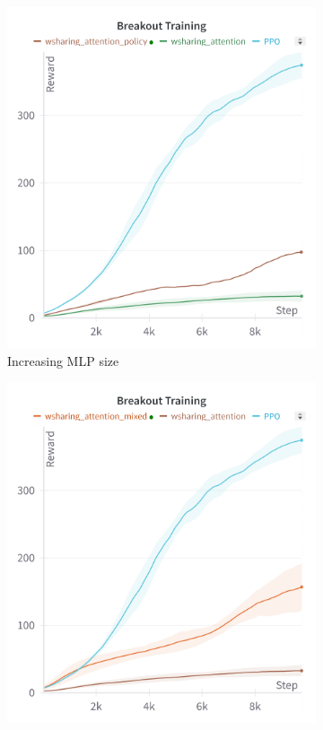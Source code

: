 \begin{figure}[ht]
    \centering
    \begin{subfigure}[b]{0.32\textwidth}
        \centering
        \includegraphics[width=\textwidth]{images/breakout_policy.png}
        \caption{Increasing MLP size}
        \label{fig:breakout_policy}
    \end{subfigure}
    \hfill
    \begin{subfigure}[b]{0.32\textwidth}
        \centering
        \includegraphics[width=\textwidth]{images/breakout_expert.png}

\end{subfigure}
\end{figure}
